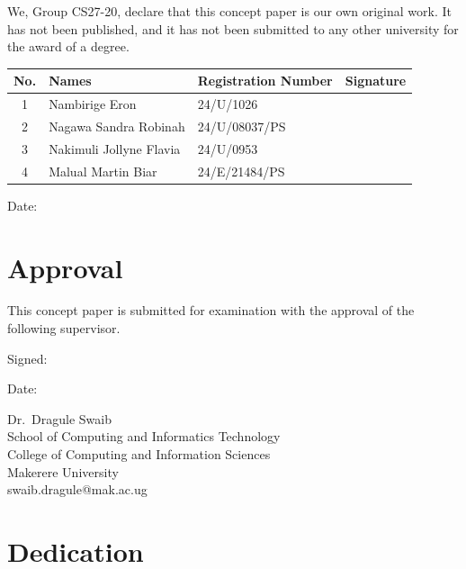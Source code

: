 \documentclass[12pt,a4paper]{article}
\makeatletter
\newcommand{\groupname}{CS27-20}
\newcommand{\supervisor}{Dr.\ Dragule Swaib}
\newcommand{\supervisoremail}{swaib.dragule@mak.ac.ug}
\newcommand{\doctypelower}{concept paper}
\makeatother
\begin{document}
We, Group \groupname, declare that this \doctypelower{} is our own original work. It has not been published, and it has not been submitted to any other university for the award of a degree.

\vspace{0.8em}
\renewcommand{\arraystretch}{2.1}
\begin{tabular}{@{}c>{\raggedright\arraybackslash}p{5.3cm}l>{\raggedright\arraybackslash}p{3.4cm}@{}}
\hline
\textbf{No.} & \textbf{Names} & \textbf{Registration Number} & \textbf{Signature}\\
\hline
1 & Nambirige Eron & 24/U/1026 & \\
2 & Nagawa Sandra Robinah & 24/U/08037/PS & \\
3 & Nakimuli Jollyne Flavia & 24/U/0953 & \\
4 & Malual Martin Biar & 24/E/21484/PS & \\
\hline
\end{tabular}
\renewcommand{\arraystretch}{1}

\vspace{1.5em}
Date: \dotfill\hspace{4cm}

\clearpage
\section*{Approval}

This \doctypelower{} is submitted for examination with the approval of the following supervisor.

\vspace{2em}
Signed: \dotfill\hspace{4cm}

\vspace{1.2em}
Date: \dotfill\hspace{4cm}

\vspace{2em}
\supervisor\\
School of Computing and Informatics Technology\\
College of Computing and Information Sciences\\
Makerere University\\
\supervisoremail

\clearpage
\section*{Dedication}
\end{document}
